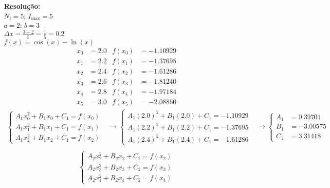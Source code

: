 \documentclass[11pt]{homework}
\begin{document}
\begin{alphaparts}
        \textbf{Resolução:}\\
        $N_i = 5$; $I_\text{max} = 5$\\
        $a=2$; $b=3$\\
        $\Delta x = \frac{3-2}{5} = \frac{1}{5} = \pmb{0.2}$\\
        $f(x) = \cos(x) - \ln(x)$
        \begin{align*}
            x_0 & = 2.0   & f(x_0) & = -1.10929 \\
            x_1 & = 2.2   & f(x_1) & = -1.37695 \\
            x_2 & = 2.4   & f(x_2) & = -1.61286 \\
            x_3 & = 2.6   & f(x_3) & = -1.81240 \\
            x_4 & = 2.8   & f(x_4) & = -1.97184 \\
            x_5 & = 3.0   & f(x_5) & = -2.08860
        \end{align*}
        \begin{align*}
            \begin{cases}
            A_1  x_0^2 + B_1  x_0 + C_1   = f(x_0) \\
            A_1  x_1^2 + B_1  x_1 + C_1   = f(x_1) \\
            A_1  x_2^2 + B_1  x_2 + C_1   = f(x_2)
            \end{cases}
            & \to 
            \begin{cases}
            A_1  (2.0)^2 + B_1  (2.0) + C_1   = -1.10929 \\
            A_1  (2.2)^2 + B_1  (2.2) + C_1   = -1.37695 \\
            A_1  (2.4)^2 + B_1  (2.4) + C_1   = -1.61286
            \end{cases}
            & \to 
            \begin{cases}
            A_1   &= 0.39701\\
            B_1   &= -3.00575\\
            C_1   &= 3.31418
            \end{cases}\\
        \end{align*}
        \begin{align*}
            \begin{cases}
            A_2  x_2^2 + B_2  x_2 + C_2   = f(x_2) \\
            A_2  x_3^2 + B_2  x_3 + C_2   = f(x_3) \\
            A_2  x_4^2 + B_2  x_4 + C_2   = f(x_4)

\end{cases}
\end{align*}
\end{alphaparts}
\end{document}
